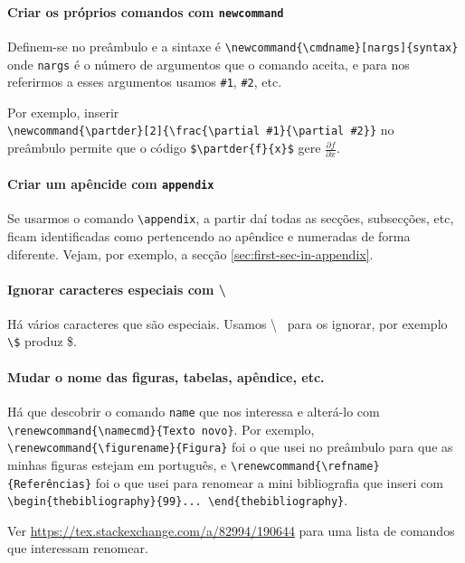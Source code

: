 \documentclass[11pt]{article}
\newcommand{\partder}[2]{\frac{\partial #1}{\partial #2}}
\renewcommand{\figurename}{Figura}
\renewcommand{\refname}{Referências}
\begin{document}
\paragraph{Criar os próprios comandos com \texttt{newcommand}}
Definem-se no preâmbulo e a sintaxe é
\verb|\newcommand{\cmdname}[nargs]{syntax}|
onde \texttt{nargs} é o número de argumentos que o comando aceita,
e para nos referirmos a esses argumentos usamos \verb|#1|, \verb|#2|, etc.

Por exemplo, inserir \\
\verb|\newcommand{\partder}[2]{\frac{\partial #1}{\partial #2}}|
no \\ preâmbulo permite que o código \verb|$\partder{f}{x}$| gere $\partder{f}{x}$.

\paragraph{Criar um apêncide com \texttt{appendix}}
Se usarmos o comando \verb|\appendix|, a partir daí todas as secções, subsecções, etc,
ficam identificadas como pertencendo ao apêndice e numeradas de forma diferente.
Vejam, por exemplo, a secção \ref{sec:first-sec-in-appendix}.

\paragraph{Ignorar caracteres especiais com \textbackslash}
Há vários caracteres que são especiais. Usamos \textbackslash~
para os ignorar, por exemplo \verb|\$| produz \$.

\paragraph{Mudar o nome das figuras, tabelas, apêndice, etc.}
Há que descobrir o comando \texttt{name} que nos interessa e alterá-lo com\\
\verb|\renewcommand{\namecmd}{Texto novo}|.
Por exemplo, \\
\verb|\renewcommand{\figurename}{Figura}| foi o que usei no preâmbulo para que
as minhas figuras estejam em português, e
\verb|\renewcommand{\refname}{Referências}| foi o que usei para renomear
a mini bibliografia que inseri com
\verb|\begin{thebibliography}{99}... \end{thebibliography}|.

Ver
\url{https://tex.stackexchange.com/a/82994/190644}
para uma lista de comandos que interessam renomear.
\end{document}
